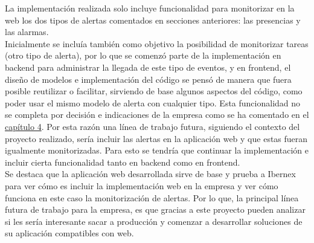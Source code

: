 La implementación realizada solo incluye funcionalidad para monitorizar en la web los dos tipos de alertas comentados en secciones anteriores: las presencias y las alarmas.\\

Inicialmente se incluía también como objetivo la posibilidad de monitorizar tareas (otro tipo de alerta), por lo que se comenzó parte de la implementación en backend para administrar la llegada de este tipo de eventos, y en frontend, el diseño de modelos e implementación del código se pensó de manera que fuera posible reutilizar o facilitar, sirviendo de base algunos aspectos del código, como poder usar el mismo modelo de alerta con cualquier tipo. Esta funcionalidad no se completa por decisión e indicaciones de la empresa como se ha comentado en el \hyperref[section-gestion-proyecto]{capítulo 4}.
Por esta razón una línea de trabajo futura, siguiendo el contexto del proyecto realizado, sería incluir las alertas en la aplicación web y que estas fueran igualmente monitorizadas. Para esto se tendría que continuar la implementación e incluir cierta funcionalidad tanto en backend como en frontend.\\

Se destaca que la aplicación web desarrollada sirve de base y prueba a Ibernex para ver cómo es incluir la implementación web en la empresa y ver cómo funciona en este caso la monitorización de alertas. Por lo que, la principal línea futura de trabajo para la empresa, es que gracias a este proyecto pueden analizar si les sería interesante sacar a producción y comenzar a desarrollar soluciones de su aplicación compatibles con web.